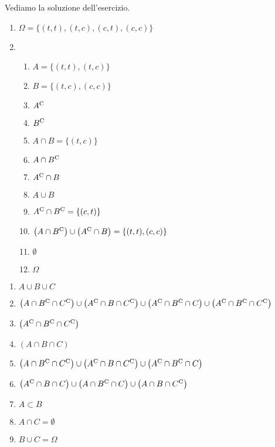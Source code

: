 Vediamo la soluzione dell'esercizio.
\begin{enumerate}
	\item $\Omega =\{(t,t) ,(t,c) ,(c,t) ,(c,c)\}$
	\item
	\begin{enumerate}
		\item $A=\{( t,t) ,( t,c)\}$
		\item $B=\{( t,c) ,( c,c)\}$
		\item $A^{\mathrm{C}}$
		\item $B^{\mathrm{C}}$
		\item $A\cap B=\{( t,c)\}$
		\item $A\cap B^{\mathrm{C}}$
		\item $A^{\mathrm{C}} \cap B$
		\item $A\cup B$
		\item $A^{\mathrm{C}} \cap B^{\mathrm{C}} =\{( c,t)\}$
		\item $\left( A\cap B^{\mathrm{C}}\right) \cup \left( A^{\mathrm{C}} \cap B\right) =\{( t,t) ,( c,c)\}$
		\item $\emptyset $
		\item $\Omega $
	\end{enumerate}
\end{enumerate}

\Soluzione

\begin{enumerate}
	\item $A\cup B\cup C$
	\item $\left( A\cap B^{\mathrm{C}} \cap C^{\mathrm{C}}\right) \cup \left( A^{\mathrm{C}} \cap B\cap C^{\mathrm{C}}\right) \cup \left( A^{\mathrm{C}} \cap B^{\mathrm{C}} \cap C\right) \cup \left( A^{\mathrm{C}} \cap B^{\mathrm{C}} \cap C^{\mathrm{C}}\right)$
	\item $\left( A^{\mathrm{C}} \cap B^{\mathrm{C}} \cap C^{\mathrm{C}}\right)$
	\item $( A\cap B\cap C)$
	\item $\left( A\cap B^{\mathrm{C}} \cap C^{\mathrm{C}}\right) \cup \left( A^{\mathrm{C}} \cap B\cap C^{\mathrm{C}}\right) \cup \left( A^{\mathrm{C}} \cap B^{\mathrm{C}} \cap C\right)$
	\item $\left( A^{\mathrm{C}} \cap B\cap C\right) \cup \left( A\cap B^{\mathrm{C}} \cap C\right) \cup \left( A\cap B\cap C^{\mathrm{C}}\right)$
	\item $A\subset B$
	\item $A\cap C=\emptyset $
	\item $B\cup C=\Omega $
\end{enumerate}


